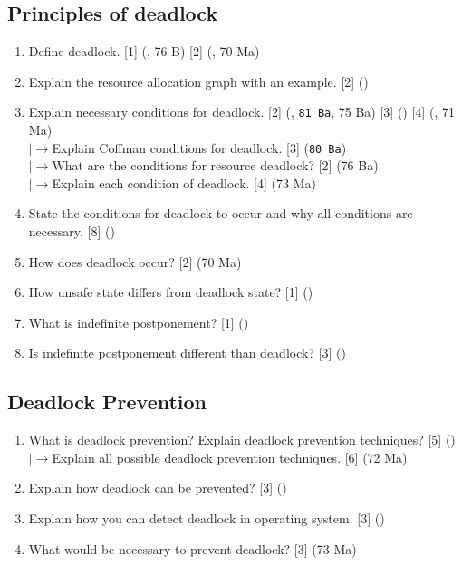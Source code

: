\documentclass[12pt]{article}
\newcommand{\lb}{\\$\left|\rightarrow\right.$}
\begin{document}
	\subsection{Principles of deadlock}
		\begin{enumerate}
			\item Define deadlock. \hfill [1] (, 76 B) [2] (, 70 Ma)
			
			\item Explain the resource allocation graph with an example. \hfill [2] ()

			\item Explain necessary conditions for deadlock. \hfill [2] (, \texttt{81 Ba}, 75 Ba) [3] () [4] (, 71 Ma)
			\lb Explain Coffman conditions for deadlock. \hfill [3] (\texttt{80 Ba})
			\lb What are the conditions for resource deadlock? \hfill [2] (76 Ba)
			\lb Explain each condition of deadlock. \hfill [4] (73 Ma)

			\item State the conditions for deadlock to occur and why all conditions are necessary. \hfill [8] ()

			\item How does deadlock occur? \hfill [2] (70 Ma)

			\item How unsafe state differs from deadlock state? \hfill [1] ()

			\item What is indefinite postponement? \hfill [1] ()
			
			\item Is indefinite postponement different than deadlock? \hfill [3] ()
			
		\end{enumerate}

	\subsection{Deadlock Prevention}
		\begin{enumerate}
			\item What is deadlock prevention? Explain deadlock prevention techniques? \hfill [5] ()
			\lb Explain all possible deadlock prevention techniques. \hfill [6] (72 Ma)

			\item Explain how deadlock can be prevented? \hfill [3] ()

			\item Explain how you can detect deadlock in operating system. \hfill [3] ()

			\item  What would be necessary to prevent deadlock? \hfill [3] (73 Ma) 
		\end{enumerate}
\end{document}
